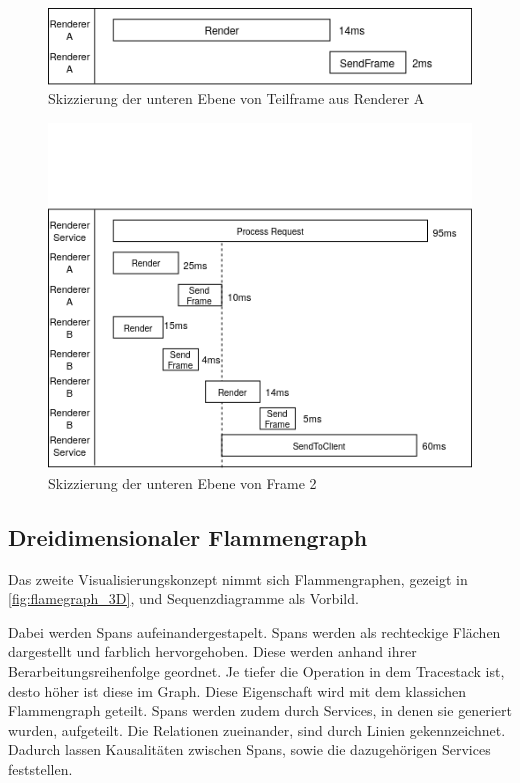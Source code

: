 \begin{figure}[!ht]
	\centering
	\includegraphics[scale=0.8]{img/Design/FrameGalerieUntereEbene2.png}
	\caption[Untere Ebene der Frame Galerie: Beispiel 2]{ Skizzierung der unteren Ebene von Teilframe aus Renderer A}
	\label{fig:FrameGalerieUntereEbene1}
\end{figure}
\begin{figure}[!ht]
	\centering
	\includegraphics[scale=0.8]{img/Design/FrameGalerieUntereEbene1.png}
	\caption[Untere Ebene der Frame Galerie: Beispiel 1]{ Skizzierung der unteren Ebene von Frame 2}
	\label{fig:FrameGalerieUntereEbene2}
\end{figure}

\subsection{Dreidimensionaler Flammengraph}
\label{subsection:Dreidimensionale Flammengraphen}

Das zweite Visualisierungskonzept nimmt sich Flammengraphen, gezeigt in \cref{fig:flamegraph_3D}, und Sequenzdiagramme als Vorbild.

Dabei werden Spans aufeinandergestapelt. Spans werden als rechteckige Flächen dargestellt und farblich hervorgehoben.	Diese werden anhand ihrer Berarbeitungsreihenfolge geordnet. Je tiefer die Operation in dem Tracestack ist, desto höher ist diese im Graph. Diese Eigenschaft wird mit dem klassichen Flammengraph geteilt. Spans werden zudem durch Services, in denen sie generiert wurden, aufgeteilt. Die Relationen zueinander, sind durch Linien gekennzeichnet. Dadurch lassen Kausalitäten zwischen Spans, sowie die dazugehörigen Services feststellen.

